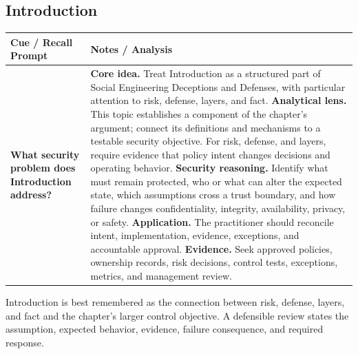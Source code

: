 \documentclass[11pt]{article}
\newcommand{\CornellHeader}{%
\rowcolor{Navy}\color{white}\bfseries Cue / Recall Prompt & \color{white}\bfseries Notes / Analysis\\\hline}
\newcommand{\CornellRow}[2]{%
\cellcolor{CueGray}\RaggedRight\textbf{#1} & \RaggedRight #2\\\hline}
\begin{document}
\subsection*{Introduction}
\begin{longtable}{>{\RaggedRight\arraybackslash}p{}|>{\RaggedRight\arraybackslash}p{}}
\CornellHeader
\CornellRow{What security problem does Introduction address?}{\textbf{Core idea.} Treat Introduction as a structured part of Social Engineering Deceptions and Defenses, with particular attention to risk, defense, layers, and fact. \textbf{Analytical lens.} This topic establishes a component of the chapter's argument; connect its definitions and mechanisms to a testable security objective. For risk, defense, and layers, require evidence that policy intent changes decisions and operating behavior. \textbf{Security reasoning.} Identify what must remain protected, who or what can alter the expected state, which assumptions cross a trust boundary, and how failure changes confidentiality, integrity, availability, privacy, or safety. \textbf{Application.} The practitioner should reconcile intent, implementation, evidence, exceptions, and accountable approval. \textbf{Evidence.} Seek approved policies, ownership records, risk decisions, control tests, exceptions, metrics, and management review.}
\end{longtable}
\begin{topicsummary}
Introduction is best remembered as the connection between risk, defense, layers, and fact and the chapter's larger control objective. A defensible review states the assumption, expected behavior, evidence, failure consequence, and required response.
\end{topicsummary}
\end{document}
